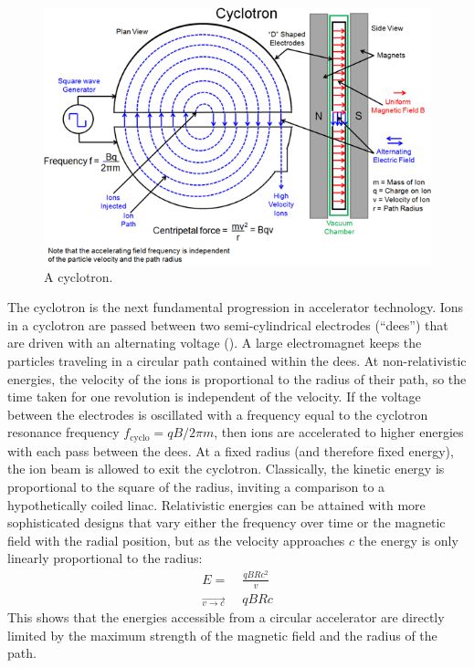 \begin{figure}[t]
  \includegraphics{cyclotron.png}
  \caption{A cyclotron.}
  \label{fig:cyclotron}
\end{figure}
The cyclotron is the next fundamental progression in accelerator technology.
Ions in a cyclotron are passed between two semi-cylindrical electrodes (``dees'') that are driven with an alternating voltage ().
A large electromagnet keeps the particles traveling in a circular path contained within the dees.
At non-relativistic energies, the velocity of the ions is proportional to the radius of their path, so the time taken for one revolution is independent of the velocity.
If the voltage between the electrodes is oscillated with a frequency equal to the cyclotron resonance frequency $f_\textrm{cyclo} = q B / 2\pi m$, then ions are accelerated to higher energies with each pass between the dees.
At a fixed radius (and therefore fixed energy), the ion beam is allowed to exit the cyclotron.
Classically, the kinetic energy is proportional to the square of the radius, inviting a comparison to a hypothetically coiled linac.
Relativistic energies can be attained with more sophisticated designs that vary either the frequency over time or the magnetic field with the radial position, but as the velocity approaches $c$ the energy is only linearly proportional to the radius:
\begin{align}
\label{eq:gyroradius}
E =& \; \frac{q B R c^2}{v}\\
\overrightarrow{{}_{v \rightarrow c}}& \; q B R c
\end{align}
This shows that the energies accessible from a circular accelerator are directly limited by the maximum strength of the magnetic field and the radius of the path.

